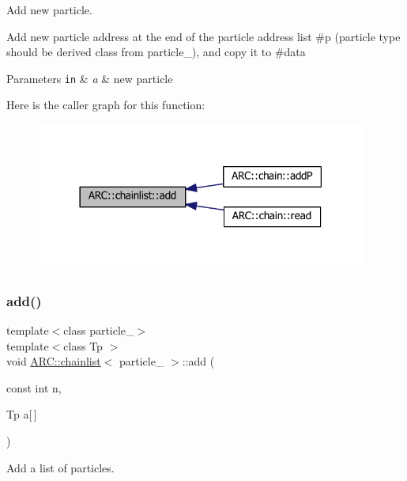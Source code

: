 Add new particle. 

Add new particle address at the end of the particle address list \#p (particle type should be derived class from particle\+\_\+), and copy it to \#data 
\begin{DoxyParams}[1]{Parameters}
\mbox{\tt in}  & {\em a} & new particle \\
\hline
\end{DoxyParams}
Here is the caller graph for this function\+:
\nopagebreak
\begin{figure}[H]
\begin{center}
\leavevmode
\includegraphics[width=309pt]{classARC_1_1chainlist_a598c1819d8e715ec0a24669e5bb06c6a_icgraph}
\end{center}
\end{figure}
\hypertarget{classARC_1_1chainlist_a1a27917b26f9be93a866dec555d5577d}{}\label{classARC_1_1chainlist_a1a27917b26f9be93a866dec555d5577d} 
\subsubsection{\texorpdfstring{add()}{add()}\hspace{0.1cm}{\footnotesize\ttfamily [2/2]}}
{\footnotesize\ttfamily template$<$class particle\+\_\+$>$ \\
template$<$class Tp $>$ \\
void \hyperlink{classARC_1_1chainlist}{A\+R\+C\+::chainlist}$<$ particle\+\_\+ $>$\+::add (\begin{DoxyParamCaption}\item[{const int}]{n,  }\item[{Tp}]{a\mbox{[}$\,$\mbox{]} }\end{DoxyParamCaption})\hspace{0.3cm}{\ttfamily [inline]}}



Add a list of particles. 

